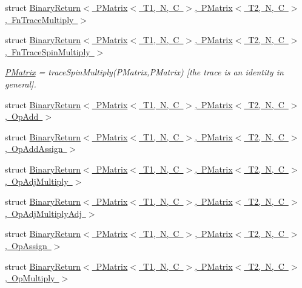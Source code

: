\begin{DoxyCompactItemize}
struct \mbox{\hyperlink{structENSEM_1_1BinaryReturn_3_01PMatrix_3_01T1_00_01N_00_01C_01_4_00_01PMatrix_3_01T2_00_01N_00_1d8da185d9b8e504049f8a2cb304a01d}{Binary\+Return$<$ P\+Matrix$<$ T1, N, C $>$, P\+Matrix$<$ T2, N, C $>$, Fn\+Trace\+Multiply $>$}}
\item 
struct \mbox{\hyperlink{structENSEM_1_1BinaryReturn_3_01PMatrix_3_01T1_00_01N_00_01C_01_4_00_01PMatrix_3_01T2_00_01N_00_27c89d09a7160e4b94859894ef7b979a}{Binary\+Return$<$ P\+Matrix$<$ T1, N, C $>$, P\+Matrix$<$ T2, N, C $>$, Fn\+Trace\+Spin\+Multiply $>$}}
\begin{DoxyCompactList}\small\item\em \mbox{\hyperlink{classENSEM_1_1PMatrix}{P\+Matrix}} = trace\+Spin\+Multiply(\+P\+Matrix,\+P\+Matrix) \mbox{[}the trace is an identity in general\mbox{]}. \end{DoxyCompactList}\item 
struct \mbox{\hyperlink{structENSEM_1_1BinaryReturn_3_01PMatrix_3_01T1_00_01N_00_01C_01_4_00_01PMatrix_3_01T2_00_01N_00_01C_01_4_00_01OpAdd_01_4}{Binary\+Return$<$ P\+Matrix$<$ T1, N, C $>$, P\+Matrix$<$ T2, N, C $>$, Op\+Add $>$}}
\item 
struct \mbox{\hyperlink{structENSEM_1_1BinaryReturn_3_01PMatrix_3_01T1_00_01N_00_01C_01_4_00_01PMatrix_3_01T2_00_01N_00_01C_01_4_00_01OpAddAssign_01_4}{Binary\+Return$<$ P\+Matrix$<$ T1, N, C $>$, P\+Matrix$<$ T2, N, C $>$, Op\+Add\+Assign $>$}}
\item 
struct \mbox{\hyperlink{structENSEM_1_1BinaryReturn_3_01PMatrix_3_01T1_00_01N_00_01C_01_4_00_01PMatrix_3_01T2_00_01N_00_0c796edb815901ee07e52957841490ec}{Binary\+Return$<$ P\+Matrix$<$ T1, N, C $>$, P\+Matrix$<$ T2, N, C $>$, Op\+Adj\+Multiply $>$}}
\item 
struct \mbox{\hyperlink{structENSEM_1_1BinaryReturn_3_01PMatrix_3_01T1_00_01N_00_01C_01_4_00_01PMatrix_3_01T2_00_01N_00_79410733ba13e6def1042c111bee3e0e}{Binary\+Return$<$ P\+Matrix$<$ T1, N, C $>$, P\+Matrix$<$ T2, N, C $>$, Op\+Adj\+Multiply\+Adj $>$}}
\item 
struct \mbox{\hyperlink{structENSEM_1_1BinaryReturn_3_01PMatrix_3_01T1_00_01N_00_01C_01_4_00_01PMatrix_3_01T2_00_01N_00_01C_01_4_00_01OpAssign_01_4}{Binary\+Return$<$ P\+Matrix$<$ T1, N, C $>$, P\+Matrix$<$ T2, N, C $>$, Op\+Assign $>$}}
\item 
struct \mbox{\hyperlink{structENSEM_1_1BinaryReturn_3_01PMatrix_3_01T1_00_01N_00_01C_01_4_00_01PMatrix_3_01T2_00_01N_00_01C_01_4_00_01OpMultiply_01_4}{Binary\+Return$<$ P\+Matrix$<$ T1, N, C $>$, P\+Matrix$<$ T2, N, C $>$, Op\+Multiply $>$}}

\end{DoxyCompactItemize}
